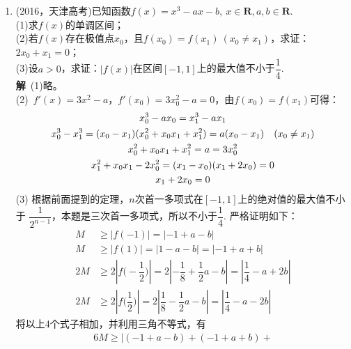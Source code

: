 \begin{enumerate}[label={【\textbf{例\thechapter.\arabic*}】},
 leftmargin=\inteval{\myenumleftmargin}pt,
 itemsep=\inteval{\myenumitempsep}pt,
 itemindent=\inteval{\myenumitemindent}pt]
综上所述，$ a>0 $. \\
(2) 令$ h(x)=g(x)-g(2-x)=\dfrac{(x-2)\e^x}{(x-1)^2}-\dfrac{(-x)\e^{2-x}}{(x-1)^2}=\dfrac{(x-2)\e^x+x\e^{2-x}}{(x-1)^2} $，再令$ \varphi(x)=(x-2)\e^x+x\e^{2-x} $，则$ \varphi'(x)=(x-1)\e^x+(1-x)\e^{2-x}=(x-1)\dfrac{\e^{2x}-\e^{2}}{\e^x}\geq 0 $，所以$ \varphi(x) $在\textbf{R}上单调递增，当$ x>1 $时，$ \varphi(x)>\varphi(1)=0,\ h(x)>0 $.不妨设$ x_1<1<x_2 $，则$ g(x_1)=g(x_2)=-a $，$ h(x_2)=g(x_2)-g(2-x_2)>0 $，$ g(x_1)=g(x_2)>g(2-x_2) $，$ x_1 $和$ 2-x_2 $
同属于$ g(x) $的单调递减区间$ (-\infty,1) $，所以$ x_1<2-x_2,\ x_1+x_2<2 $. 

\item (2016，天津高考)已知函数$ f(x)=x^3-ax-b,\ x\in \textbf{R},a,b\in 
\textbf{R} $.\\
(1)求$ f(x) $的单调区间；\\
(2)若$ f(x) $存在极值点$ x_0 $，且$ f(x_0)=f(x_1)\ (x_0\neq x_1) $，求证：$ 2x_0+x_1=0 $；\\
(3)设$ a>0 $，求证：$ |f(x)| $在区间$ [-1,1] $上的最大值不小于$ \dfrac{1}{4} $.\\
\textbf{解}\ (1)略。\\
(2)\ $ f'(x)=3x^2-a $，$ f'(x_0)=3x_0^2-a=0 $，由$ f(x_0)=f(x_1) $可得：
\begin{gather*}
    x_0^3-ax_0=x_1^3-ax_1 \\
    x_0^3-x_1^3=(x_0-x_1)(x_0^2+x_0x_1+x_1^2)=a(x_0-x_1)\quad (x_0\neq x_1) \\
    x_0^2+x_0x_1+x_1^2=a=3x_0^2 \\
    x_1^2+x_0x_1-2x_0^2=(x_1-x_0)(x_1+2x_0)=0 \\  
    x_1+2x_0=0
\end{gather*}  
(3) 根据前面提到的定理，$ n $次首一多项式在$ [-1,1] $上的绝对值的最大值不小于
$ \dfrac{1}{2^{n-1}} $，本题是三次首一多项式，所以不小于$ \dfrac{1}{4} $. 
严格证明如下：
\begin{align*}
    M&\geq |f(-1)|=|-1+a-b| \\
    M&\geq |f(1)|=|1-a-b|=|-1+a+b| \\
    2M&\geq 2\left|f\Big(-\dfrac{1}{2}\Big)\right|=
    2\left|-\dfrac{1}{8}+\dfrac{1}{2}a-b\right|=
    \left|\dfrac{1}{4}-a+2b\right| \\
    2M&\geq 2\left|f\Big( \dfrac{1}{2}\Big)\right|=
    2\left| \dfrac{1}{8}-\dfrac{1}{2}a-b\right|=
    \left|\dfrac{1}{4}-a-2b\right|
\end{align*}
将以上4个式子相加，并利用三角不等式，有
\begin{gather*}
    6M\geq \left|(-1+a-b)+(-1+a+b)+

\end{gather*}
\end{enumerate}
